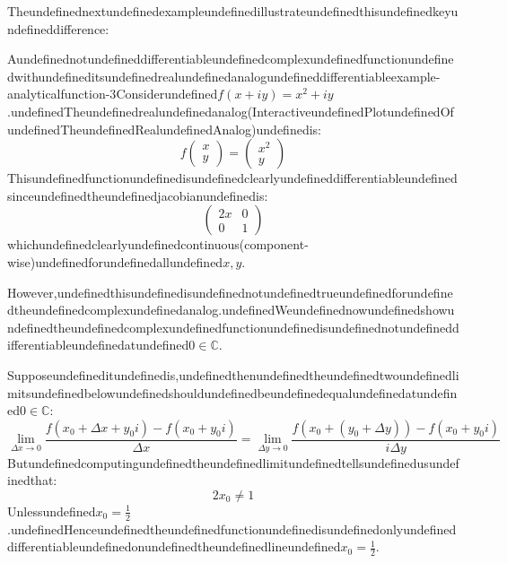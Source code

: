 Theundefinednextundefinedexampleundefinedillustrateundefinedthisundefinedkeyundefineddifference:

\begin{mystthmexample}{Aundefinednotundefineddifferentiableundefinedcomplexundefinedfunctionundefinedwithundefineditsundefinedrealundefinedanalogundefineddifferentiable}{example-analyticalfunction-3}Considerundefined$f(x+iy)=x^2 + iy$.undefinedTheundefinedrealundefinedanalog(InteractiveundefinedPlotundefinedOfundefinedTheundefinedRealundefinedAnalog)undefinedis:
\begin{equation}
f\begin{pmatrix}
x \\
y
\end{pmatrix}= 
\begin{pmatrix}
x^2 \\
y
\end{pmatrix}
\end{equation}
Thisundefinedfunctionundefinedisundefinedclearlyundefineddifferentiableundefinedsinceundefinedtheundefinedjacobianundefinedis:
\begin{equation}
\begin{pmatrix}
2x & 0 \\
0 & 1
\end{pmatrix}
\end{equation}
whichundefinedclearlyundefinedcontinuous(component-wise)undefinedforundefinedallundefined$x,y$.

However,undefinedthisundefinedisundefinednotundefinedtrueundefinedforundefinedtheundefinedcomplexundefinedanalog.undefinedWeundefinednowundefinedshowundefinedtheundefinedcomplexundefinedfunctionundefinedisundefinednotundefineddifferentiableundefinedatundefined$0\in \mathbb{C}$.

Supposeundefineditundefinedis,undefinedthenundefinedtheundefinedtwoundefinedlimitsundefinedbelowundefinedshouldundefinedbeundefinedequalundefinedatundefined$0\in \mathbb{C}$:
\begin{equation}
\label{complex_derivative_limit}
\lim_{\Delta x\to 0}\frac{f(x_0 + \Delta x + y_0i) -f(x_0 + y_0 i)}{\Delta x} = \lim_{\Delta y\to 0}\frac{f(x_0 + (y_0 +\Delta y)) -f(x_0 + y_0 i)}{i\Delta y }
\end{equation}
Butundefinedcomputingundefinedtheundefinedlimitundefinedtellsundefinedusundefinedthat:
\begin{equation}
2x_0 \neq 1
\end{equation}
Unlessundefined$x_0 = \frac{1}{2}$.undefinedHenceundefinedtheundefinedfunctionundefinedisundefinedonlyundefineddifferentiableundefinedonundefinedtheundefinedlineundefined$x_0=\frac12$.


\end{mystthmexample}
